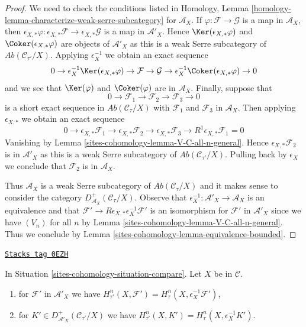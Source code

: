 \begin{proof}
We need to check the conditions listed in
Homology, Lemma \ref{homology-lemma-characterize-weak-serre-subcategory}
for $\mathcal{A}_X$. If $\varphi : \mathcal{F} \to \mathcal{G}$ is a map
in $\mathcal{A}_X$, then $\epsilon_{X, *}\varphi :
\epsilon_{X, *}\mathcal{F} \to \epsilon_{X, *}\mathcal{G}$
is a map in $\mathcal{A}'_X$. Hence $\Ker(\epsilon_{X, *}\varphi)$ and
$\Coker(\epsilon_{X, *}\varphi)$ are objects of $\mathcal{A}'_X$
as this is a weak Serre subcategory of $\textit{Ab}(\mathcal{C}_{\tau'}/X)$.
Applying $\epsilon_X^{-1}$ we obtain an exact sequence
$$
0 \to
\epsilon_X^{-1}\Ker(\epsilon_{X, *}\varphi) \to
\mathcal{F} \to \mathcal{G} \to
\epsilon_X^{-1}\Coker(\epsilon_{X, *}\varphi) \to 0
$$
and we see that $\Ker(\varphi)$ and $\Coker(\varphi)$ are in
$\mathcal{A}_X$. Finally, suppose that
$$
0 \to \mathcal{F}_1 \to \mathcal{F}_2 \to \mathcal{F}_3 \to 0
$$
is a short exact sequence in $\textit{Ab}(\mathcal{C}_\tau/X)$
with $\mathcal{F}_1$ and $\mathcal{F}_3$ in $\mathcal{A}_X$.
Then applying $\epsilon_{X, *}$ we obtain an exact sequence
$$
0 \to
\epsilon_{X, *}\mathcal{F}_1 \to
\epsilon_{X, *}\mathcal{F}_2 \to
\epsilon_{X, *}\mathcal{F}_3 \to
R^1\epsilon_{X, *}\mathcal{F}_1 = 0
$$
Vanishing by Lemma \ref{sites-cohomology-lemma-V-C-all-n-general}.
Hence $\epsilon_{X, *}\mathcal{F}_2$ is in $\mathcal{A}'_X$
as this is a weak Serre subcategory of $\textit{Ab}(\mathcal{C}_{\tau'}/X)$.
Pulling back by $\epsilon_X$ we conclude that
$\mathcal{F}_2$ is in $\mathcal{A}_X$.

\medskip\noindent
Thus $\mathcal{A}_X$ is a weak Serre subcategory of
$\textit{Ab}(\mathcal{C}_\tau/X)$ and it makes sense
to consider the category $D^+_{\mathcal{A}_X}(\mathcal{C}_\tau/X)$.
Observe that $\epsilon_X^{-1} : \mathcal{A}'_X \to \mathcal{A}_X$
is an equivalence and that
$\mathcal{F}' \to R\epsilon_{X, *}\epsilon_X^{-1}\mathcal{F}'$
is an isomorphism for $\mathcal{F}'$ in $\mathcal{A}'_X$ since we
have $(V_n)$ for all $n$ by Lemma \ref{sites-cohomology-lemma-V-C-all-n-general}.
Thus we conclude by Lemma \ref{sites-cohomology-lemma-equivalence-bounded}.
\end{proof}

\begin{lemma}
\label{sites-cohomology-lemma-compare-cohomology-general}
\href{https://stacks.math.columbia.edu/tag/0EZH}{\texttt{Stacks tag 0EZH}}

In Situation \ref{sites-cohomology-situation-compare}. Let $X$ be in $\mathcal{C}$.
\begin{enumerate}
\item for $\mathcal{F}'$ in $\mathcal{A}'_X$ we have
$H^n_{\tau'}(X, \mathcal{F}') = H^n_\tau(X, \epsilon_X^{-1}\mathcal{F}')$,
\item for $K' \in D^+_{\mathcal{A}'_X}(\mathcal{C}_{\tau'}/X)$
we have $H^n_{\tau'}(X, K') = H^n_\tau(X, \epsilon_X^{-1}K')$.
\end{enumerate}
\end{lemma}


